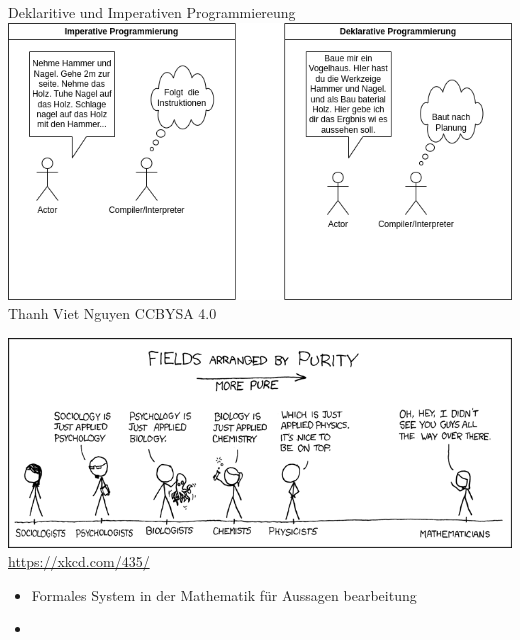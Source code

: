 \documentclass{beamer}
\begin{document}
\begin{frame}{Deklaritive und Imperativen Programmiereung}
\centering
\includegraphics[scale=0.38]{bilder/ProgrammierParadigmen.drawio.png}
\textmd{Thanh Viet Nguyen CCBYSA 4.0}
\end{frame}

\begin{frame}
	\centering
	\includegraphics[scale=0.35]{bilder/purity.png}
    \textmd{\url{https://xkcd.com/435/}}
\end{frame}

\begin{frame}
	\begin{itemize}
	    \item Formales System in der Mathematik für Aussagen bearbeitung
            \item
	\end{itemize}
\end{frame}
\end{document}
